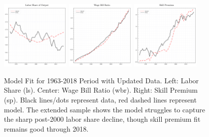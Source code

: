 \documentclass[12pt]{article}
\begin{document}
\begin{figure}[H]
 \centering
 \includegraphics[width=0.3\textwidth]{../images/fig:updated_estimation_ls_doc.pdf}
 \hfill
 \includegraphics[width=0.3\textwidth]{../images/fig:updated_estimation_wbr_doc.pdf}
 \hfill
 \includegraphics[width=0.3\textwidth]{../images/fig:updated_estimation_sp_doc.pdf}
 \caption{\label{fig:korv_estimation_extended} Model Fit for 1963-2018 Period with Updated Data. Left: Labor Share (ls). Center: Wage Bill Ratio (wbr). Right: Skill Premium (sp). Black lines/dots represent data, red dashed lines represent model. The extended sample shows the model struggles to capture the sharp post-2000 labor share decline, though skill premium fit remains good through 2018.}
\end{figure}
\end{document}
